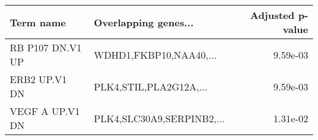 \begin{tabular}{llr}
\toprule
       Term name &      Overlapping genes... &  Adjusted p-value \\
\midrule
RB P107 DN.V1 UP &    WDHD1,FKBP10,NAA40,... &          9.59e-03 \\
   ERB2 UP.V1 DN &    PLK4,STIL,PLA2G12A,... &          9.59e-03 \\
 VEGF A UP.V1 DN & PLK4,SLC30A9,SERPINB2,... &          1.31e-02 \\
\bottomrule
\end{tabular}
